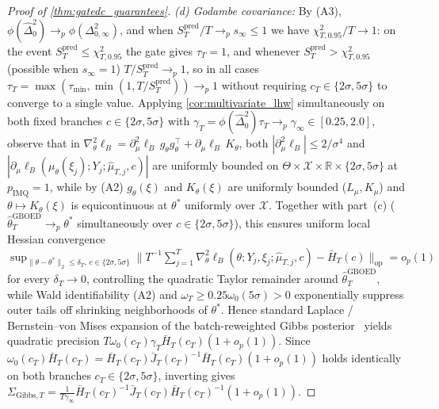 \documentclass[11pt,a4paper,reqno]{amsart}
\theoremstyle{definition}
\theoremstyle{remark}
\newcommand{\R}{\mathbb{R}}
\newcommand{\Xcal}{\mathcal{X}}
\begin{document}
\begin{proof}[Proof of \cref{thm:gatedc_guarantees}]
\emph{(d) Godambe covariance:} By (A3), $\phi(\hat{\Delta}_0^2) \to_p \phi(\Delta_{0,\infty}^2)$, and when $S_T^{\mathrm{pred}}/T \to_p s_\infty \le 1$ we have $\chi^2_{T, 0.95}/T \to 1$: on the event $S_T^{\mathrm{pred}} \le \chi^2_{T, 0.95}$ the gate gives $\tau_T = 1$, and whenever $S_T^{\mathrm{pred}} > \chi^2_{T, 0.95}$ (possible when $s_\infty = 1$) $T/S_T^{\mathrm{pred}} \to_p 1$, so in all cases $\tau_T = \max(\tau_{\min}, \min(1, T/S_T^{\mathrm{pred}})) \to_p 1$ without requiring $c_T \in \{2\sigma, 5\sigma\}$ to converge to a single value. Applying \cref{cor:multivariate_lhw} simultaneously on both fixed branches $c \in \{2\sigma, 5\sigma\}$ with $\gamma_T = \phi(\hat{\Delta}_0^2)\tau_T \to_p \gamma_\infty \in [0.25, 2.0]$, observe that in $\nabla_\theta^2 \ell_B = \partial_\mu^2 \ell_B\,g_\theta g_\theta^\top + \partial_\mu \ell_B\,K_\theta$, both $|\partial_\mu^2 \ell_B| \le 2/\sigma^4$ and $|\partial_\mu \ell_B(\mu_\theta(\xi_j); Y_j; \hat{\mu}_{T,j}, c)|$ are uniformly bounded on $\Theta \times \Xcal \times \R \times \{2\sigma, 5\sigma\}$ at $p_{\mathrm{IMQ}} = 1$, while by (A2) $g_\theta(\xi)$ and $K_\theta(\xi)$ are uniformly bounded ($L_\mu, K_\mu$) and $\theta \mapsto K_\theta(\xi)$ is equicontinuous at $\theta^*$ uniformly over $\Xcal$. Together with part~(c) ($\hat{\theta}_T^{\mathrm{GBOED}} \to_p \theta^*$ simultaneously over $c \in \{2\sigma, 5\sigma\}$), this ensures uniform local Hessian convergence $\sup_{\|\theta - \theta^*\|_2 \le \delta_T,\, c \in \{2\sigma, 5\sigma\}} \|T^{-1}\sum_{j=1}^T \nabla_\theta^2 \ell_B(\theta; Y_j, \xi_j; \hat{\mu}_{T,j}, c) - \bar{H}_T(c)\|_{\mathrm{op}} = o_p(1)$ for every $\delta_T \to 0$, controlling the quadratic Taylor remainder around $\hat{\theta}_T^{\mathrm{GBOED}}$, while Wald identifiability (A2) and $\omega_T \ge 0.25\omega_0(5\sigma) > 0$ exponentially suppress outer tails off shrinking neighborhoods of $\theta^*$. Hence standard Laplace / Bernstein--von Mises expansion of the batch-reweighted Gibbs posterior~\cite{lyddon2019general} yields quadratic precision $T\omega_0(c_T)\gamma_T\bar{H}_T(c_T)(1 + o_p(1))$. Since $\omega_0(c_T)\bar{H}_T(c_T) = \bar{H}_T(c_T)\bar{J}_T(c_T)^{-1}\bar{H}_T(c_T)(1 + o_p(1))$ holds identically on both branches $c_T \in \{2\sigma, 5\sigma\}$, inverting gives $\Sigma_{\mathrm{Gibbs}, T} = \frac{1}{T\gamma_\infty}\bar{H}_T(c_T)^{-1}\bar{J}_T(c_T)\bar{H}_T(c_T)^{-1}(1 + o_p(1))$.
\end{proof}
\end{document}
